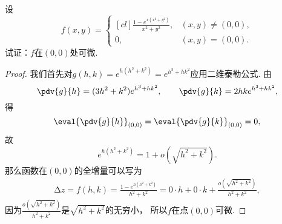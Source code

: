 \begin{example}
设\begin{equation*}
	f(x,y)
	= \begin{cases}[cl]
		\frac{1 - e^{x(x^2+y^2)}}{x^2+y^2}, & (x,y)\neq(0,0), \\
		0, & (x,y)=(0,0).
	\end{cases}
\end{equation*}试证：\(f\)在\((0,0)\)处可微.
\begin{proof}
我们首先对\(g(h,k) = e^{h(h^2+k^2)} = e^{h^3+hk^2}\)应用二维泰勒公式.
由\begin{equation*}
	\pdv{g}{h} = (3h^2+k^2)e^{h^3+hk^2}, \qquad
	\pdv{g}{k} = 2hke^{h^3+hk^2},
\end{equation*}得\begin{equation*}
	\eval{\pdv{g}{h}}_{(0,0)}
	= \eval{\pdv{g}{k}}_{(0,0)}
	= 0,
\end{equation*}
故\begin{equation*}
	e^{h(h^2+k^2)} = 1 + o(\sqrt{h^2+k^2}).
\end{equation*}
那么函数在\((0,0)\)的全增量可以写为
\begin{align*}
	\increment z
	= f(h,k)
	= \frac{1 - e^{h(h^2+k^2)}}{h^2+k^2}
	= 0 \cdot h + 0 \cdot k + \frac{o(\sqrt{h^2+k^2})}{h^2+k^2},
\end{align*}
因为\(\frac{o(\sqrt{h^2+k^2})}{h^2+k^2}\)是\(\sqrt{h^2+k^2}\)的无穷小，
所以\(f\)在点\((0,0)\)可微.
\end{proof}
\end{example}
